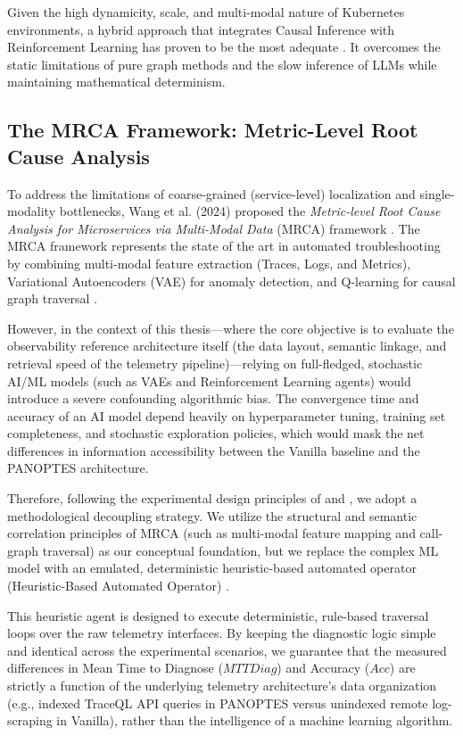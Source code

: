 Given the high dynamicity, scale, and multi-modal nature of Kubernetes environments, a hybrid approach that integrates Causal Inference with Reinforcement Learning has proven to be the most adequate \cite{barata_2026, wang_2024}. It overcomes the static limitations of pure graph methods and the slow inference of LLMs while maintaining mathematical determinism.

\subsection{The MRCA Framework: Metric-Level Root Cause Analysis}

To address the limitations of coarse-grained (service-level) localization and single-modality bottlenecks, Wang et al. (2024) proposed the \textit{Metric-level Root Cause Analysis for Microservices via Multi-Modal Data} (MRCA) framework \cite{wang_2024}. The MRCA framework represents the state of the art in automated troubleshooting by combining multi-modal feature extraction (Traces, Logs, and Metrics), Variational Autoencoders (VAE) for anomaly detection, and Q-learning for causal graph traversal \cite{wang_2024}.

However, in the context of this thesis—where the core objective is to evaluate the observability reference architecture itself (the data layout, semantic linkage, and retrieval speed of the telemetry pipeline)—relying on full-fledged, stochastic AI/ML models (such as VAEs and Reinforcement Learning agents) would introduce a severe confounding algorithmic bias. The convergence time and accuracy of an AI model depend heavily on hyperparameter tuning, training set completeness, and stochastic exploration policies, which would mask the net differences in information accessibility between the Vanilla baseline and the PANOPTES architecture.

Therefore, following the experimental design principles of  and , we adopt a methodological decoupling strategy. We utilize the structural and semantic correlation principles of MRCA (such as multi-modal feature mapping and call-graph traversal) as our conceptual foundation, but we replace the complex ML model with an emulated, deterministic heuristic-based automated operator (Heuristic-Based Automated Operator) \cite{barata_2026}. 

This heuristic agent is designed to execute deterministic, rule-based traversal loops over the raw telemetry interfaces. By keeping the diagnostic logic simple and identical across the experimental scenarios, we guarantee that the measured differences in Mean Time to Diagnose ($MTTDiag$) and Accuracy ($Acc$) are strictly a function of the underlying telemetry architecture's data organization (e.g., indexed TraceQL API queries in PANOPTES versus unindexed remote log-scraping in Vanilla), rather than the intelligence of a machine learning algorithm.


